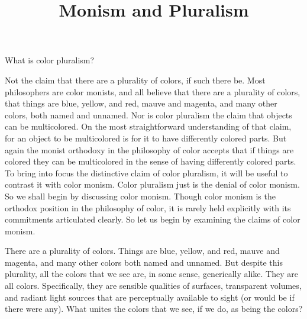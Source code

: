 \documentclass[12pt]{article}
\title{Monism and Pluralism}
\author{\myauthor}
\date{} %
\begin{document}
\maketitle

\setlength{\parindent}{1em}


What is color pluralism? 

Not the claim that there are a plurality of colors, if such there be. Most philosophers are color monists, and all believe that there are a plurality of colors, that things are blue, yellow, and red, mauve and magenta, and many other colors, both named and unnamed. Nor is color pluralism the claim that objects can be multicolored. On the most straightforward understanding of that claim, for an object to be multicolored is for it to have differently colored parts. But again the monist orthodoxy in the philosophy of color accepts that if things are colored they can be multicolored in the sense of having differently colored parts. To bring into focus the distinctive claim of color pluralism, it will be useful to contrast it with color monism. Color pluralism just is the denial of color monism. So we shall begin by discussing color monism. Though color monism is the orthodox position in the philosophy of color, it is rarely held explicitly with its commitments articulated clearly. So let us begin by examining the claims of color monism.

There are a plurality of colors. Things are blue, yellow, and red, mauve and magenta, and many other colors both named and unnamed. But despite this plurality, all the colors that we see are, in some sense, generically alike. They are all colors. Specifically, they are sensible qualities of surfaces, transparent volumes, and radiant light sources that are perceptually available to sight (or would be if there were any). What unites the colors that we see, if we do, as being the colors?
\end{document}
